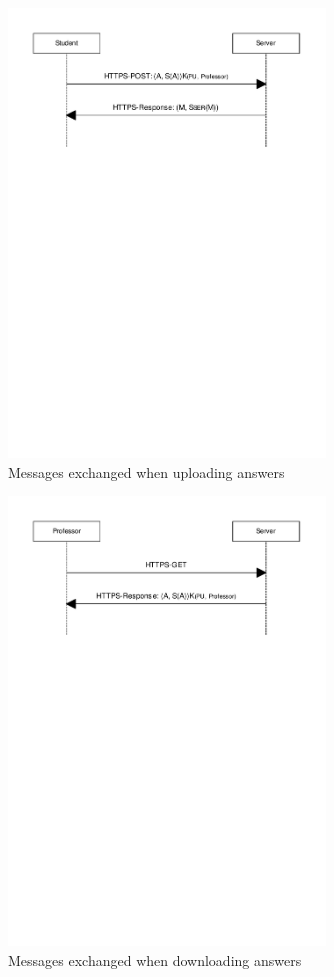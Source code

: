 \documentclass{article}
\begin{document}
\begin{figure}
\begin{center}
\includegraphics[width=0.75\textwidth]{images/upload_answers.pdf}
\caption{Messages exchanged when uploading answers}
\label{fig:upload-answers}
\end{center}
\end{figure}

\begin{figure}
\begin{center}
\includegraphics[width=0.75\textwidth]{images/download_answers.pdf}
\caption{Messages exchanged when downloading answers}
\label{fig:download-answers}
\end{center}
\end{figure}
\end{document}
